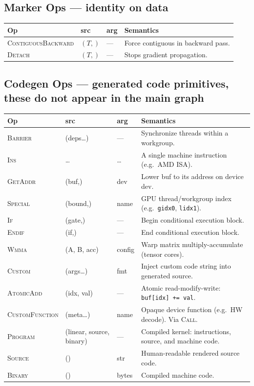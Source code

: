 \documentclass[10pt,letterpaper]{article}
\newcommand{\op}[1]{\textsc{#1}}
\begin{document}
\subsection*{{\color{markerorange}Marker Ops} \normalfont\small--- identity on data}

\begin{tabular}{@{}l l l l@{}}
\toprule
\textbf{Op} & \textbf{src} & \textbf{arg} & \textbf{Semantics} \\
\midrule
\op{ContiguousBackward} & $(T,)$ & --- & Force contiguous in backward pass. \\
\op{Detach} & $(T,)$ & --- & Stops gradient propagation. \\
\bottomrule
\end{tabular}

\subsection*{Codegen Ops \normalfont\small--- generated code primitives, these do not appear in the main graph}

\begin{tabular}{@{}l l l l@{}}
\toprule
\textbf{Op} & \textbf{src} & \textbf{arg} & \textbf{Semantics} \\
\midrule
\op{Barrier} & (deps\ldots) & --- & Synchronize threads within a workgroup. \\
\op{Ins} & \ldots & \ldots & A single machine instruction (e.g.\ AMD ISA). \\
\op{GetAddr} & (buf,) & dev & Lower buf to its address on device dev. \\
\op{Special} & (bound,) & name & GPU thread/workgroup index (e.g.\ \texttt{gidx0}, \texttt{lidx1}). \\
\op{If} & (gate,) & --- & Begin conditional execution block. \\
\op{Endif} & (if,) & --- & End conditional execution block. \\
\op{Wmma} & (A, B, acc) & config & Warp matrix multiply-accumulate (tensor cores). \\
\op{Custom} & (args\ldots) & fmt & Inject custom code string into generated source. \\
\op{AtomicAdd} & (idx, val) & --- & Atomic read-modify-write: \texttt{buf[idx] += val}. \\[4pt]
\op{CustomFunction} & (meta\ldots) & name & Opaque device function (e.g.\ HW decode). Via \op{Call}. \\
\op{Program} & (linear, source, binary) & --- & Compiled kernel: instructions, source, and machine code. \\
\op{Source} & () & str & Human-readable rendered source code. \\
\op{Binary} & () & bytes & Compiled machine code. \\
\bottomrule
\end{tabular}
\end{document}

